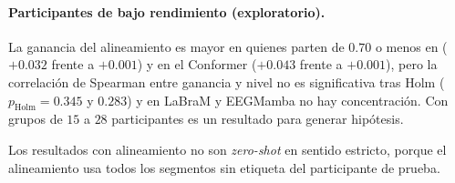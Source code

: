\paragraph{Participantes de bajo rendimiento (exploratorio).} La ganancia del alineamiento es mayor en
quienes parten de $0.70$ o menos en \eegnet{} ($+0.032$ frente a $+0.001$) y en el Conformer ($+0.043$ frente
a $+0.001$), pero la correlación de Spearman entre ganancia y nivel no es significativa tras Holm
($p_{\text{Holm}} = 0.345$ y $0.283$) y en LaBraM y EEGMamba no hay concentración. Con grupos de $15$ a $28$
participantes es un resultado para generar hipótesis.

Los resultados con alineamiento no son \textit{zero-shot} en sentido estricto, porque el alineamiento usa
todos los segmentos sin etiqueta del participante de prueba.

